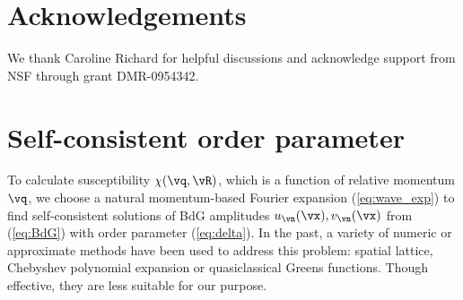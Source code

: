 \documentclass[prb,aps,showpacs,amsmath,twocolumn,10pt]{revtex4-1}
\begin{document}

\section{Acknowledgements}

We thank Caroline Richard for helpful discussions and 
acknowledge support from NSF through grant DMR-0954342. 



\appendix*

\section{Self-consistent order parameter}
\label{app:self-cons}

To calculate susceptibility $\chi(\vq,\vR)$, which is a function
of relative momentum $\vq$, we choose a natural momentum-based Fourier
expansion (\ref{eq:wave_exp}) to find 
self-consistent solutions of BdG amplitudes $u_\vn(\vx),v_\vn(\vx)$ from (\ref{eq:BdG}) with order parameter
(\ref{eq:delta}). 
In the past, a variety of numeric or approximate
methods have been used to address this problem: 
\cite{PhysRevLett.105.167006, Vorontsov2005fflo, PhysRevLett.80.4763, RevModPhys.76.263, RevModPhys.77.935,
JPSJ.68.3120, PhysRevB.57.8709, PhysRevLett.110.131601} 
spatial lattice,\cite{appropriate}
Chebyshev polynomial expansion\cite{appropriate} or
quasiclassical Greens functions.\cite{appropriate} 
Though effective, they are less suitable for our purpose. 
\end{document}
